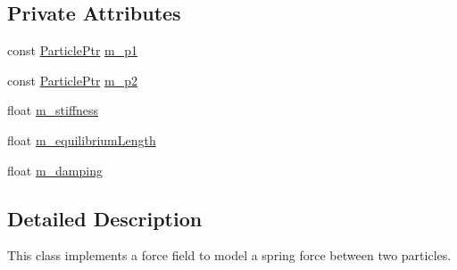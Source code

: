 \subsection*{Private Attributes}
\begin{DoxyCompactItemize}
\item 
const \hyperlink{Particle_8hpp_a9a7abc8635002993537b61ef2c857fdd}{Particle\+Ptr} \hyperlink{classSpringForceField_af560f73fe0aa07349798ea07f63b93a0}{m\+\_\+p1}
\item 
const \hyperlink{Particle_8hpp_a9a7abc8635002993537b61ef2c857fdd}{Particle\+Ptr} \hyperlink{classSpringForceField_aed1df7a9b0e889d23ba2a70c8ffcf2d6}{m\+\_\+p2}
\item 
float \hyperlink{classSpringForceField_a19fa7376f0067977dfbda789172c730b}{m\+\_\+stiffness}
\item 
float \hyperlink{classSpringForceField_a26b41db047cd562842de4bc3e1a53e68}{m\+\_\+equilibrium\+Length}
\item 
float \hyperlink{classSpringForceField_a29ae6e468663723051140fb0e856a27b}{m\+\_\+damping}
\end{DoxyCompactItemize}


\subsection{Detailed Description}
This class implements a force field to model a spring force between two particles. 

